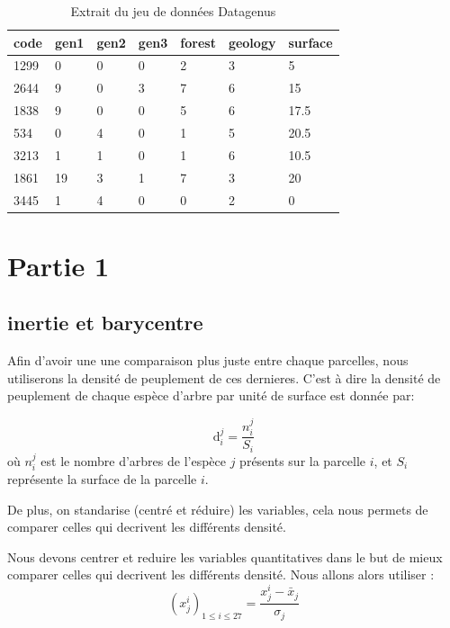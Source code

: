 \documentclass{article}
\begin{document}
\begin{table}[H]
    \centering
    \begin{tabular}{|l|l|l|l|l|l|l|}
    \hline
    code & gen1 & gen2 & gen3 & forest & geology & surface \\ \hline
    1299 & 0    & 0    & 0    & 2      & 3       & 5       \\ \hline
    2644 & 9    & 0    & 3    & 7      & 6       & 15      \\ \hline
    1838 & 9    & 0    & 0    & 5      & 6       & 17.5    \\ \hline
    534  & 0    & 4    & 0    & 1      & 5       & 20.5    \\ \hline
    3213 & 1    & 1    & 0    & 1      & 6       & 10.5    \\ \hline
    1861 & 19   & 3    & 1    & 7      & 3       & 20      \\ \hline
    3445 & 1    & 4    & 0    & 0      & 2       & 0       \\ \hline
    \end{tabular}
    \caption{Extrait du jeu de données Datagenus}
\end{table}



\section{Partie 1}
\subsection{inertie et barycentre}

Afin d'avoir une une comparaison plus juste entre chaque parcelles, nous utiliserons la densité de peuplement de ces dernieres. C'est à dire 
la densité de peuplement de chaque espèce d'arbre par unité de surface est donnée par:

\[
\text{d}_i^j = \frac{n_i^j}{S_i}
\]
où \(n_i^j\) est le nombre d'arbres de l'espèce \(j\) présents sur la parcelle \(i\), et \(S_i\) représente la surface de la parcelle \(i\).

\vspace{2\baselineskip}


De plus, on standarise (centré et réduire) les variables, cela nous permets de comparer celles qui decrivent les différents densité. 

Nous devons centrer et reduire les variables quantitatives dans le but de mieux comparer celles qui decrivent les différents densité.
Nous allons alors utiliser :
\[
(x_j^i)_{1 \leq i \leq 27} = \frac{x_j^i - \bar{x}_j}{\sigma_j}
\]
\end{document}
